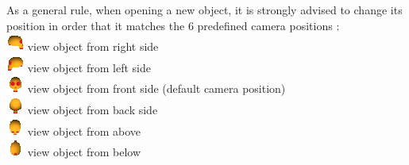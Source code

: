 \documentclass[12pt, a4paper]{book}
\begin{document}
 As a general rule, when opening a new object, it is strongly advised to change
its position in order that it matches the 6 predefined camera positions :\\
\includegraphics[scale=0.7]{../images/06/camera/camera_right.png} view object from right side \\
\includegraphics[scale=0.7]{../images/06/camera/camera_left.png} view object from left side\\
\includegraphics[scale=0.7]{../images/06/camera/camera_front.png} view object from front side (default camera position)\\
\includegraphics[scale=0.7]{../images/06/camera/camera_back.png} view object from back side\\
\includegraphics[scale=0.7]{../images/06/camera/camera_above.png} view object from above\\
\includegraphics[scale=0.7]{../images/06/camera/camera_below.png} view object from below\\
\end{document}
